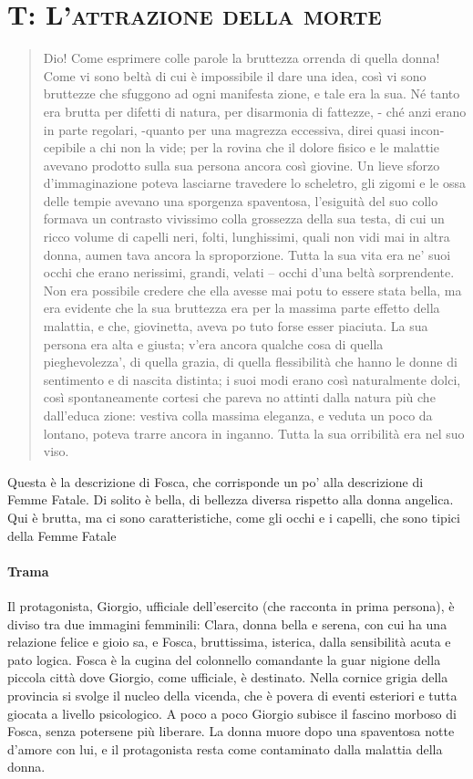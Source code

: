 \documentclass{book}
\begin{document}
\section{T: \textsc{L'attrazione della morte}}

\begin{quote}
	Dio! Come esprimere colle parole la bruttezza orrenda di quella donna! Come vi sono beltà di cui è impossibile il dare una idea, così vi sono bruttezze che sfuggono ad ogni manifesta zione, e tale era la sua. Né tanto era brutta per difetti di natura, per disarmonia di fattezze, - ché anzi erano in parte regolari, -quanto per una magrezza eccessiva, direi quasi incon- cepibile a chi non la vide; per la rovina che il dolore fisico e le malattie avevano prodotto sulla sua persona ancora così giovine. Un lieve sforzo d'immaginazione poteva lasciarne travedere lo scheletro, gli zigomi e le ossa delle tempie avevano una sporgenza spaventosa, l'esiguità del suo collo formava un contrasto vivissimo colla grossezza della sua testa, di cui un ricco volume di capelli neri, folti, lunghissimi, quali non vidi mai in altra donna, aumen tava ancora la sproporzione. Tutta la sua vita era ne' suoi occhi che erano nerissimi, grandi, velati – occhi d'una beltà sorprendente. Non era possibile credere che ella avesse mai potu to essere stata bella, ma era evidente che la sua bruttezza era per la massima parte effetto della malattia, e che, giovinetta, aveva po tuto forse esser piaciuta. La sua persona era alta e giusta; v'era ancora qualche cosa di quella pieghevolezza', di quella grazia, di quella flessibilità che hanno le donne di sentimento e di nascita distinta; i suoi modi erano così naturalmente dolci, così spontaneamente cortesi che pareva no attinti dalla natura più che dall'educa zione: vestiva colla massima eleganza, e veduta un poco da lontano, poteva trarre ancora in inganno. Tutta la sua orribilità era nel suo viso.
\end{quote}

Questa è la descrizione di Fosca, che corrisponde un po' alla
descrizione di Femme Fatale. Di solito è bella, di bellezza diversa
rispetto alla donna angelica. Qui è brutta, ma ci sono caratteristiche,
come gli occhi e i capelli, che sono tipici della Femme Fatale

\paragraph{Trama} Il protagonista, Giorgio, ufficiale dell'esercito (che racconta in prima persona), è diviso tra due immagini femminili: Clara, donna bella e serena, con cui ha una relazione felice e gioio sa, e Fosca, bruttissima, isterica, dalla sensibilità acuta e pato logica. Fosca è la cugina del colonnello comandante la guar nigione della piccola città dove Giorgio, come ufficiale, è destinato. Nella cornice grigia della provincia si svolge il nucleo della vicenda, che è povera di eventi esteriori e tutta giocata a livello psicologico. A poco a poco Giorgio subisce il fascino morboso di Fosca, senza potersene più liberare. La donna muore dopo una spaventosa notte d'amore con lui, e il protagonista resta come contaminato dalla malattia della donna.
\end{document}
